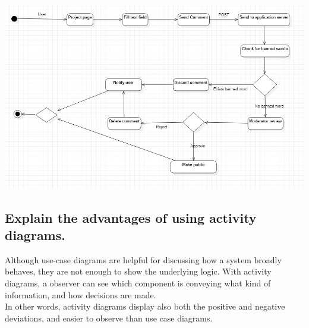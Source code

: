 	\includegraphics[width=\textwidth]{images/UseCase8_Comment.png}		
		
		\subsection{Explain the advantages of using activity diagrams.}
		
		Although use-case diagrams are helpful for discussing how a system broadly behaves, they are not enough to show the underlying logic. With activity diagrams, a observer can see which component is conveying what kind of information, and how decisions are made.\\
		
		In other words, activity diagrams display also both the positive and negative deviations, and easier to observe than use case diagrams.